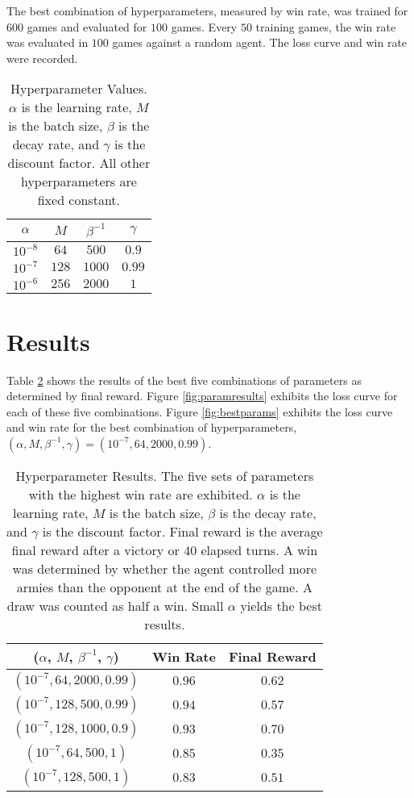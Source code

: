 \documentclass[final,5p,times,twocolumn]{elsarticle}
\begin{document}
The best combination of hyperparameters, measured by win rate, was trained for $600$ games and evaluated for $100$ games. Every $50$ training games, the win rate was evaluated in $100$ games against a random agent. The loss curve and win rate were recorded.

\begin{table}
  \centering
  \begin{tabular}{cccc}
      \toprule
      $\alpha$ & $M$ & $\beta^{-1}$ & $\gamma$ \\
      \midrule
      $10^{-8}$   & $64$  & $500$  & $0.9$  \\
      $10^{-7}$   & $128$ & $1000$ & $0.99$ \\
      $10^{-6}$   & $256$ & $2000$ & $1$    \\
      \bottomrule
  \end{tabular}
  \caption{Hyperparameter Values. $\alpha$ is the learning rate, $M$ is the batch size, $\beta$ is the decay rate, and $\gamma$ is the discount factor. All other hyperparameters are fixed constant.}
  \label{tab:hyper}
\end{table}

\section{Results}
\label{sec:results}

Table \ref{tab:hyperresults} shows the results of the best five combinations of parameters as determined by final reward. Figure \ref{fig:paramresults} exhibits the loss curve for each of these five combinations. Figure \ref{fig:bestparams} exhibits the loss curve and win rate for the best combination of hyperparameters, $(\alpha, M, \beta^{-1}, \gamma) = (10^{-7}, 64, 2000, 0.99)$.

\begin{table}[h!]
  \centering
  \begin{tabular}{ccc}
    \toprule
    ($\alpha$, $M$, $\beta^{-1}$, $\gamma$) & Win Rate & Final Reward \\
    \midrule
    $(10^{-7}, 64, 2000, 0.99)$   & $0.96$ & $0.62$ \\
    $(10^{-7}, 128, 500, 0.99)$   & $0.94$ & $0.57$ \\
    $(10^{-7}, 128, 1000, 0.9)$   & $0.93$ & $0.70$ \\
    $(10^{-7}, 64, 500, 1)$       & $0.85$ & $0.35$ \\
    $(10^{-7}, 128, 500, 1)$      & $0.83$ & $0.51$ \\
    \bottomrule
  \end{tabular}
  \caption{Hyperparameter Results. The five sets of parameters with the highest win rate are exhibited. $\alpha$ is the learning rate, $M$ is the batch size, $\beta$ is the decay rate, and $\gamma$ is the discount factor. Final reward is the average final reward after a victory or $40$ elapsed turns. A win was determined by whether the agent controlled more armies than the opponent at the end of the game. A draw was counted as half a win. Small $\alpha$ yields the best results.}
  \label{tab:hyperresults}
\end{table}
\end{document}

